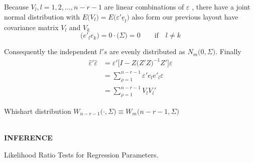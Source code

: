 \documentclass[11pt,a4paper]{article}
\theoremstyle{definition}
\begin{document}
Because $V_l, l=1,2,\ldots, n-r-1$ are linear combinations of $\varepsilon$ , there have a joint normal distribution with $E\big(V_l\big) = E\big(\varepsilon'\underline{e}_l\big)$ also form our previous layout have covariance matrix $V_l$  and $V_k$
$$\big(e'_le_k\big) = 0\cdot\big(\Sigma\big) =0\qquad \text{if}\quad  l\neq k$$

Consequently the independent $l's$ are evenly distributed as $N_m\big(0,\Sigma\big)$. Finally 
\begin{align*}
\widehat{\varepsilon}'\widehat{\varepsilon} & = \varepsilon' \big[I- Z\big(Z'Z\big)^{-1}Z'\big]\varepsilon\\
& = \sum^{n-r-1}_{\rho=1}\varepsilon'e_le'_l\varepsilon\\ &
 = \sum^{n-r-1}_{\rho=1} V_lV_l'
\end{align*}

Whishart distribution $W_{n-r-1}\Big(\cdot , \Sigma\Big)\equiv W_m\Big(n-r-1,\Sigma\Big)$\\\\








\begin{center}
\textbf{INFERENCE}
\end{center}
Likelihood Ratio Tests for Regression Parameters.\\
\end{document}
